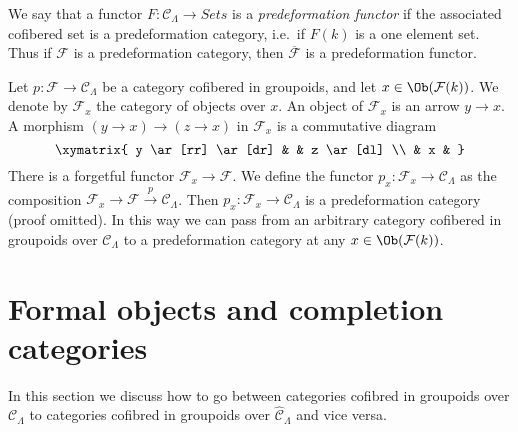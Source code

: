 \begin{remark}
\label{remark-predeformation-functor}
We say that a functor $F: \mathcal{C}_\Lambda \to \textit{Sets}$
is a {\it predeformation functor} if the associated cofibered set is a
predeformation category, i.e.\ if $F(k)$ is a one element set.  Thus if
$\mathcal{F}$ is a predeformation category, then $\overline{\mathcal{F}}$ is a
predeformation functor.
\end{remark}

\begin{remark}
\label{remark-localize-cofibered-groupoid}
Let $p : \mathcal{F} \to \mathcal{C}_\Lambda$ be a category cofibered in
groupoids, and let $x \in \Ob(\mathcal{F}(k))$.  We denote by
$\mathcal{F}_x$ the category of objects over $x$.
An object of $\mathcal{F}_x$ is an arrow $y \to x$.
A morphism $(y \to x) \to (z \to x)$ in $\mathcal{F}_x$ is a commutative
diagram
$$
\xymatrix{
y \ar[rr] \ar[dr] & & z \ar[dl] \\
& x &
}
$$
There is a forgetful functor $\mathcal{F}_x \to \mathcal{F}$. We define
the functor $p_x : \mathcal{F}_x \to \mathcal{C}_\Lambda$ as the
composition
$\mathcal{F}_x \to \mathcal{F} \xrightarrow{p} \mathcal{C}_\Lambda$.
Then $p_x : \mathcal{F}_x \to \mathcal{C}_\Lambda$ is a
predeformation category (proof omitted). In this way we can pass from an
arbitrary category cofibered in groupoids over $\mathcal{C}_\Lambda$
to a predeformation category at any $x \in \Ob(\mathcal{F}(k))$.
\end{remark}






\section{Formal objects and completion categories}
\label{section-formal-objects}

\noindent
In this section we discuss how to go between categories cofibred in
groupoids over $\mathcal{C}_\Lambda$ to categories cofibred in
groupoids over $\widehat{\mathcal{C}}_\Lambda$ and vice versa.

